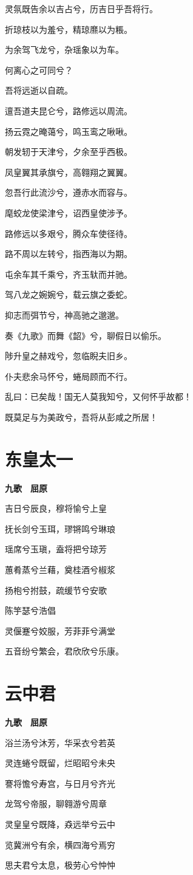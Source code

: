 \documentclass[12pt,a4paper]{ctexbook}
\begin{document}
灵氛既告余以吉占兮，历吉日乎吾将行。\par
折琼枝以为羞兮，精琼爢以为粻。\par
为余驾飞龙兮，杂瑶象以为车。\par
何离心之可同兮？\par
吾将远逝以自疏。\par
邅吾道夫昆仑兮，路修远以周流。\par
扬云霓之晻蔼兮，鸣玉鸾之啾啾。\par
朝发轫于天津兮，夕余至乎西极。\par
凤皇翼其承旗兮，高翱翔之翼翼。\par
忽吾行此流沙兮，遵赤水而容与。\par
麾蛟龙使梁津兮，诏西皇使涉予。\par
路修远以多艰兮，腾众车使径待。\par
路不周以左转兮，指西海以为期。\par
屯余车其千乘兮，齐玉轪而并驰。\par
驾八龙之婉婉兮，载云旗之委蛇。\par
抑志而弭节兮，神高驰之邈邈。\par
奏《九歌》而舞《韶》兮，聊假日以偷乐。\par
陟升皇之赫戏兮，忽临睨夫旧乡。\par
仆夫悲余马怀兮，蜷局顾而不行。\par
乱曰：已矣哉！国无人莫我知兮，又何怀乎故都！\par
既莫足与为美政兮，吾将从彭咸之所居！\par

\section{东皇太一}
\textbf{九歌　屈原}\par\vspace{0.5em}
吉日兮辰良，穆将愉兮上皇\par
抚长剑兮玉珥，璆锵鸣兮琳琅\par
瑶席兮玉瑱，盍将把兮琼芳\par
蕙肴蒸兮兰藉，奠桂酒兮椒浆\par
扬枹兮拊鼓，疏缓节兮安歌\par
陈竽瑟兮浩倡\par
灵偃蹇兮姣服，芳菲菲兮满堂\par
五音纷兮繁会，君欣欣兮乐康。\par

\section{云中君}
\textbf{九歌　屈原}\par\vspace{0.5em}
浴兰汤兮沐芳，华采衣兮若英\par
灵连蜷兮既留，烂昭昭兮未央\par
謇将憺兮寿宫，与日月兮齐光\par
龙驾兮帝服，聊翱游兮周章\par
灵皇皇兮既降，猋远举兮云中\par
览冀洲兮有余，横四海兮焉穷\par
思夫君兮太息，极劳心兮忡忡\par
\end{document}
